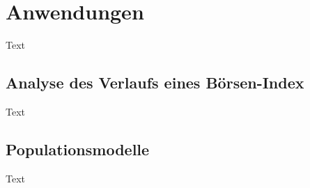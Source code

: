 %
%
%
%
\section{Anwendungen\label{brown:section:teil2}}

Text

\subsection{Analyse des Verlaufs eines Börsen-Index
\label{brown:subsection:boersenIndex}}

Text

\subsection{Populationsmodelle
\label{brown:subsection:popModelle}}

Text
